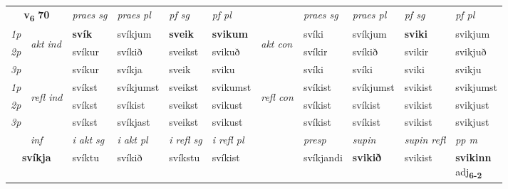\noindent
\begin{tabular}{lllllllllll} \toprule
\multicolumn{2}{c}{\textbf{v{\textsubscript{6}}} \Large{\textbf{70}}}  &  \textit{praes sg}  & \textit{praes pl}  &\textit{ pf sg} & \textit{pf pl} &  &  \textit{praes sg}  & \textit{praes pl}  & \textit{pf sg} & \textit{pf pl } \\*
	\cmidrule{3-6} \cmidrule{8-11}
 {\textit{1p}} & \multirow{3}{*}{\begin{turn}{90}\textit{akt ind}\end{turn}} & \textbf{svík} & svíkjum & \textbf{sveik} & \textbf{svikum} & \multirow{3}{*}{\begin{turn}{90}\textit{akt con}\end{turn}} &svíki & svíkjum & \textbf{sviki} & svikjum\\*
 {\textit{2p}} &  &  svíkur  & svíkið & sveikst & svikuð & & svíkir & svíkið & svikir & svikjuð \\*
{\textit{3p}} &  & svíkur & svíkja & sveik & sviku & & svíki & svíki& sviki & svikju \\*
\cmidrule{3-6} \cmidrule{8-11}
 {\textit{1p}} & \multirow{3}{*}{\begin{turn}{90}\textit{refl ind}\end{turn}}  & svíkst & svíkjumst & sveikst & svikumst & \multirow{3}{*}{\begin{turn}{90}\textit{refl con}\end{turn}}  &svíkist & svíkjumst & svikist & svikjumst \\*
 {\textit{2p}} &  & svíkst & svíkist & sveikst & svikust & &svíkist & svíkist & svikist & svikjust \\*
 {\textit{3p}}  & & svíkst & svíkjast & sveikst & svikust & & svíkist & svíkist& svikist & svikjust \\*
\cmidrule{3-6} \cmidrule{8-11}

   \multicolumn{2}{c}{\textit{inf}}  & \textit{i akt sg} & \textit{i akt pl} & \textit{i refl sg} & \textit{i refl pl} && \textit{presp} & \textit{supin} & \textit{supin refl} & \textit{pp m} \\*
  \multicolumn{2}{c}{\textbf{svíkja}} & svíktu  & svíkið & svíkstu & svíkist && svíkjandi &  \textbf{svikið} & svikist & \specialcell{\textbf{svikinn} \\ adj\textbf{\textsubscript{6-2}}} \\*
\end{tabular}

